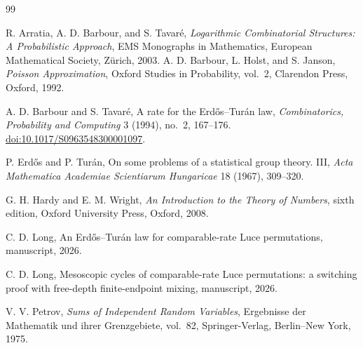 \documentclass[11pt]{article}
\theoremstyle{remark}
\begin{document}
\begin{thebibliography}{99}

R. Arratia, A. D. Barbour, and S. Tavar\'e,
\newblock \emph{Logarithmic Combinatorial Structures: A Probabilistic
Approach},
\newblock EMS Monographs in Mathematics, European Mathematical Society,
Z\"urich, 2003.
A. D. Barbour, L. Holst, and S. Janson,
\newblock \emph{Poisson Approximation},
\newblock Oxford Studies in Probability, vol.~2, Clarendon Press, Oxford,
1992.

A. D. Barbour and S. Tavar\'e,
\newblock A rate for the Erd\H{o}s--Tur\'an law,
\newblock \emph{Combinatorics, Probability and Computing} 3 (1994), no.~2,
167--176.
\newblock \href{https://doi.org/10.1017/S0963548300001097}
{doi:10.1017/S0963548300001097}.

P. Erd\H{o}s and P. Tur\'an,
\newblock On some problems of a statistical group theory. III,
\newblock \emph{Acta Mathematica Academiae Scientiarum Hungaricae} 18
(1967), 309--320.

G. H. Hardy and E. M. Wright,
\newblock \emph{An Introduction to the Theory of Numbers}, sixth edition,
\newblock Oxford University Press, Oxford, 2008.

C. D. Long,
\newblock An Erd\H{o}s--Tur\'an law for comparable-rate Luce permutations,
\newblock manuscript, 2026.

C. D. Long,
\newblock Mesoscopic cycles of comparable-rate Luce permutations: a
switching proof with free-depth finite-endpoint mixing,
\newblock manuscript, 2026.

V. V. Petrov,
\newblock \emph{Sums of Independent Random Variables},
\newblock Ergebnisse der Mathematik und ihrer Grenzgebiete, vol.~82,
Springer-Verlag, Berlin--New York, 1975.

\end{thebibliography}
\end{document}
